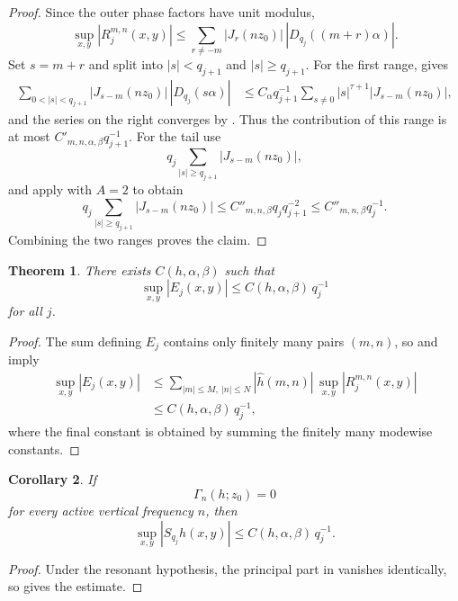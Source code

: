\documentclass[11pt,reqno]{amsart}
\newtheorem{theorem}{Theorem}[section]
\newtheorem{corollary}[theorem]{Corollary}
\theoremstyle{definition}
\newcommand{\abs}[1]{\left\lvert #1 \right\rvert}
\newcommand{\qj}{q_j}
\newcommand{\qjp}{q_{j+1}}
\begin{document}
\begin{proof}
Since the outer phase factors have unit modulus,
\[
\sup_{x,y}\abs{R_j^{m,n}(x,y)}
\le
\sum_{r\ne -m}\abs{J_r(nz_0)}\,\abs{D_{\qj}((m+r)\alpha)}.
\]
Set $s=m+r$ and split into $\abs{s}<\qjp$ and $\abs{s}\ge \qjp$. For the first range,
 gives
\[
\begin{aligned}
\sum_{0<\abs{s}<\qjp}\abs{J_{s-m}(nz_0)}\,\abs{D_{\qj}(s\alpha)}
&\le
C_\alpha \qjp^{-1}\sum_{s\ne 0}\abs{s}^{\tau+1}\abs{J_{s-m}(nz_0)},
\end{aligned}
\]
and the series on the right converges by . Thus the contribution of this
range is at most $C'_{m,n,\alpha,\beta}\qjp^{-1}$. For the tail use
\[
\qj \sum_{\abs{s}\ge \qjp}\abs{J_{s-m}(nz_0)},
\]
and apply  with $A=2$ to obtain
\[
\qj \sum_{\abs{s}\ge \qjp}\abs{J_{s-m}(nz_0)}
\le
C''_{m,n,\beta}\qj \qjp^{-2}
\le
C''_{m,n,\beta}\qj^{-1}.
\]
Combining the two ranges proves the claim.
\end{proof}

\begin{theorem}\label{thm:quantitative-obstruction}
There exists $C(h,\alpha,\beta)$ such that
\[
\sup_{x,y}\abs{E_j(x,y)}
\le C(h,\alpha,\beta)\,\qj^{-1}
\]
for all $j$.
\end{theorem}

\begin{proof}
The sum defining $E_j$ contains only finitely many pairs $(m,n)$, so 
and  imply
\[
\begin{aligned}
\sup_{x,y}\abs{E_j(x,y)}
&\le
\sum_{\abs{m}\le M,\ \abs{n}\le N}
\abs{\widehat h(m,n)}\,\sup_{x,y}\abs{R_j^{m,n}(x,y)}\\
&\le
C(h,\alpha,\beta)\,\qj^{-1},
\end{aligned}
\]
where the final constant is obtained by summing the finitely many modewise constants.
\end{proof}

\begin{corollary}\label{cor:resonant-cocycle}
If
\[
\Gamma_n(h;z_0)=0
\]
for every active vertical frequency $n$, then
\[
\sup_{x,y}\abs{S_{\qj} h(x,y)} \le C(h,\alpha,\beta)\,\qj^{-1}.
\]
\end{corollary}

\begin{proof}
Under the resonant hypothesis, the principal part in  vanishes
identically, so  gives the estimate.
\end{proof}
\end{document}

